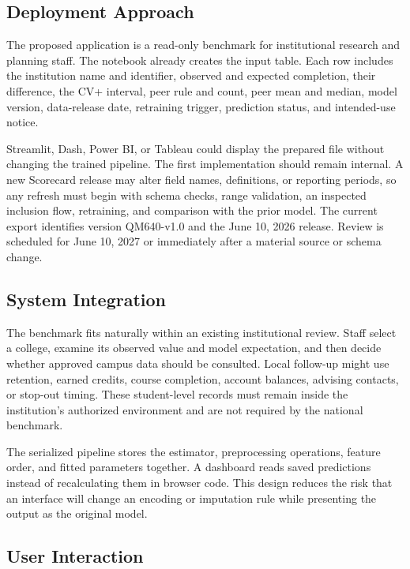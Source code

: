 \documentclass[12pt,a4paper]{article}
\begin{document}
\subsection{Deployment Approach}

The proposed application is a read-only benchmark for institutional research and planning staff. The notebook already creates the input table. Each row includes the institution name and identifier, observed and expected completion, their difference, the CV+ interval, peer rule and count, peer mean and median, model version, data-release date, retraining trigger, prediction status, and intended-use notice.

Streamlit, Dash, Power BI, or Tableau could display the prepared file without changing the trained pipeline. The first implementation should remain internal. A new Scorecard release may alter field names, definitions, or reporting periods, so any refresh must begin with schema checks, range validation, an inspected inclusion flow, retraining, and comparison with the prior model. The current export identifies version QM640-v1.0 and the June 10, 2026 release. Review is scheduled for June 10, 2027 or immediately after a material source or schema change.

\subsection{System Integration}

The benchmark fits naturally within an existing institutional review. Staff select a college, examine its observed value and model expectation, and then decide whether approved campus data should be consulted. Local follow-up might use retention, earned credits, course completion, account balances, advising contacts, or stop-out timing. These student-level records must remain inside the institution's authorized environment and are not required by the national benchmark.

The serialized pipeline stores the estimator, preprocessing operations, feature order, and fitted parameters together. A dashboard reads saved predictions instead of recalculating them in browser code. This design reduces the risk that an interface will change an encoding or imputation rule while presenting the output as the original model.

\subsection{User Interaction}
\end{document}
